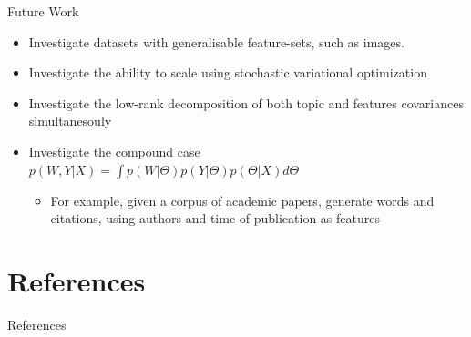 \documentclass[xcolor=dvipsnames]{beamer}
\begin{document}
\begin{frame}{Future Work}
    \begin{itemize}
    \item Investigate datasets with generalisable feature-sets, such as images.
    \item Investigate the ability to scale using stochastic variational optimization \cite{Hoffman2012}
    \item Investigate the low-rank decomposition of both topic and features covariances simultanesouly
    \item Investigate the compound case $p(W,Y|X) = \int p(W|\Theta) p(Y|\Theta) p(\Theta|X) d\Theta$
        \begin{itemize}
            \item For example, given a corpus of academic papers, generate words and citations, using authors and time of publication as features
        \end{itemize}
     \end{itemize}
\end{frame}


\begin{frame}

\end{frame}






\section{References}
\begin{frame}[allowframebreaks]{References}

{\tiny 
    
    
}

\end{frame}
\end{document}
